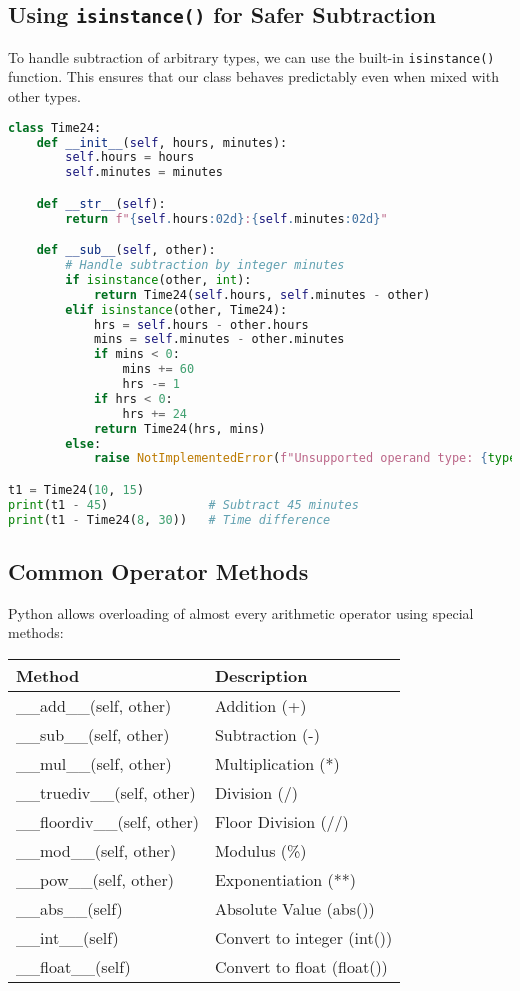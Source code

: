 \subsection*{Using \texttt{isinstance()} for Safer Subtraction}

To handle subtraction of arbitrary types, we can use the built-in \texttt{isinstance()} function.  
This ensures that our class behaves predictably even when mixed with other types.

\begin{lstlisting}[language=Python, caption={The isinstance() check in operator overloading}]
class Time24:
    def __init__(self, hours, minutes):
        self.hours = hours
        self.minutes = minutes

    def __str__(self):
        return f"{self.hours:02d}:{self.minutes:02d}"

    def __sub__(self, other):
        # Handle subtraction by integer minutes
        if isinstance(other, int):
            return Time24(self.hours, self.minutes - other)
        elif isinstance(other, Time24):
            hrs = self.hours - other.hours
            mins = self.minutes - other.minutes
            if mins < 0:
                mins += 60
                hrs -= 1
            if hrs < 0:
                hrs += 24
            return Time24(hrs, mins)
        else:
            raise NotImplementedError(f"Unsupported operand type: {type(other)}")

t1 = Time24(10, 15)
print(t1 - 45)              # Subtract 45 minutes
print(t1 - Time24(8, 30))   # Time difference
\end{lstlisting}

\subsection*{Common Operator Methods}

Python allows overloading of almost every arithmetic operator using special methods:

\begin{center}
\begin{tabular}{ll}
\textbf{Method} & \textbf{Description} \\
\hline
\_\_add\_\_(self, other) & Addition (+) \\
\_\_sub\_\_(self, other) & Subtraction (-) \\
\_\_mul\_\_(self, other) & Multiplication (*) \\
\_\_truediv\_\_(self, other) & Division (/) \\
\_\_floordiv\_\_(self, other) & Floor Division (//) \\
\_\_mod\_\_(self, other) & Modulus (\%) \\
\_\_pow\_\_(self, other) & Exponentiation (**) \\
\_\_abs\_\_(self) & Absolute Value (abs()) \\
\_\_int\_\_(self) & Convert to integer (int()) \\
\_\_float\_\_(self) & Convert to float (float()) \\
\end{tabular}
\end{center}

